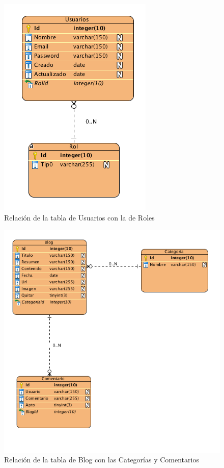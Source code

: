 \begin{figure}
\begin{center}
\includegraphics[scale=0.7]{imagenes/Usuarios.png}
\caption{Relación de la tabla de Usuarios con la de Roles}
\label{users_bd}
\end{center}
\end{figure}

\begin{figure}
\begin{center}
\includegraphics[scale=0.7]{imagenes/blog.png}
\caption{Relación de la tabla de Blog con las Categorías y Comentarios}
\label{blog_bd}
\end{center}
\end{figure}

